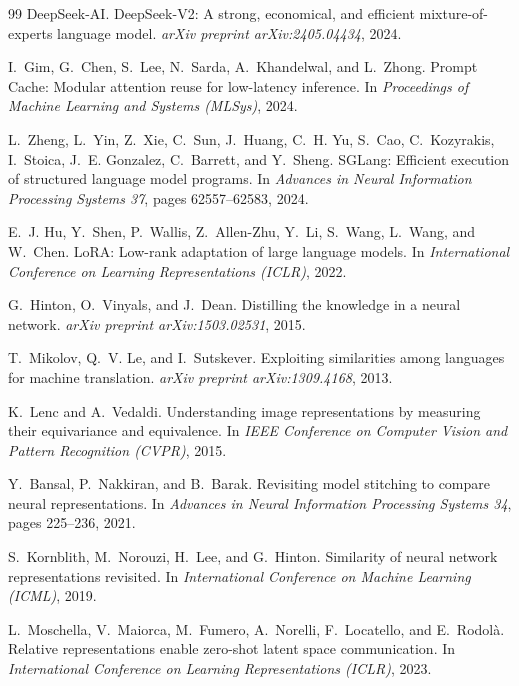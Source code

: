 \documentclass[11pt]{article}
\begin{document}
\begin{thebibliography}{99}
DeepSeek-AI.
\newblock DeepSeek-V2: A strong, economical, and efficient mixture-of-experts language model.
\newblock \emph{arXiv preprint arXiv:2405.04434}, 2024.

I.~Gim, G.~Chen, S.~Lee, N.~Sarda, A.~Khandelwal, and L.~Zhong.
\newblock Prompt Cache: Modular attention reuse for low-latency inference.
\newblock In \emph{Proceedings of Machine Learning and Systems (MLSys)}, 2024.

L.~Zheng, L.~Yin, Z.~Xie, C.~Sun, J.~Huang, C.~H. Yu, S.~Cao, C.~Kozyrakis, I.~Stoica, J.~E. Gonzalez, C.~Barrett, and Y.~Sheng.
\newblock SGLang: Efficient execution of structured language model programs.
\newblock In \emph{Advances in Neural Information Processing Systems 37}, pages 62557--62583, 2024.

E.~J. Hu, Y.~Shen, P.~Wallis, Z.~Allen-Zhu, Y.~Li, S.~Wang, L.~Wang, and W.~Chen.
\newblock LoRA: Low-rank adaptation of large language models.
\newblock In \emph{International Conference on Learning Representations (ICLR)}, 2022.

G.~Hinton, O.~Vinyals, and J.~Dean.
\newblock Distilling the knowledge in a neural network.
\newblock \emph{arXiv preprint arXiv:1503.02531}, 2015.

T.~Mikolov, Q.~V. Le, and I.~Sutskever.
\newblock Exploiting similarities among languages for machine translation.
\newblock \emph{arXiv preprint arXiv:1309.4168}, 2013.

K.~Lenc and A.~Vedaldi.
\newblock Understanding image representations by measuring their equivariance and equivalence.
\newblock In \emph{IEEE Conference on Computer Vision and Pattern Recognition (CVPR)}, 2015.

Y.~Bansal, P.~Nakkiran, and B.~Barak.
\newblock Revisiting model stitching to compare neural representations.
\newblock In \emph{Advances in Neural Information Processing Systems 34}, pages 225--236, 2021.

S.~Kornblith, M.~Norouzi, H.~Lee, and G.~Hinton.
\newblock Similarity of neural network representations revisited.
\newblock In \emph{International Conference on Machine Learning (ICML)}, 2019.

L.~Moschella, V.~Maiorca, M.~Fumero, A.~Norelli, F.~Locatello, and E.~Rodol{\`a}.
\newblock Relative representations enable zero-shot latent space communication.
\newblock In \emph{International Conference on Learning Representations (ICLR)}, 2023.


\end{thebibliography}
\end{document}
